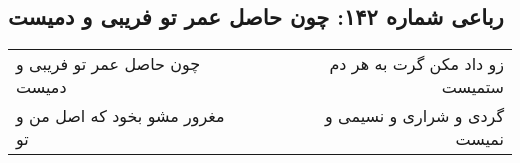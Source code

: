 \begin{center}
\section*{رباعی شماره ۱۴۲: چون حاصل عمر تو فریبی و دمیست}
\label{sec:sh142}
\begin{longtable}{l p{0.5cm} r}
چون حاصل عمر تو فریبی و دمیست
&&
زو داد مکن گرت به هر دم ستمیست
\\
مغرور مشو بخود که اصل من و تو
&&
گردی و شراری و نسیمی و نمیست
\\
\end{longtable}
\end{center}
